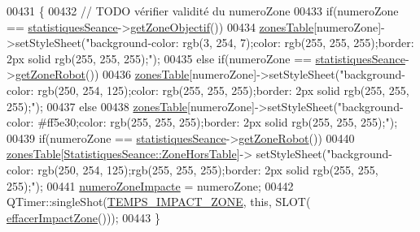 \begin{DoxyCode}
00431 \{
00432     \textcolor{comment}{// TODO vérifier validité du numeroZone}
00433     \textcolor{keywordflow}{if}(numeroZone == \hyperlink{class_ttpa_ihm_abed6897d6f7b4d3a5eb8dcc07651e740}{statistiquesSeance}->\hyperlink{class_statistiques_seance_a61c01cb1d35cda871e8243658213ee5b}{getZoneObjectif}())
00434         \hyperlink{class_ttpa_ihm_af77d75f1aa3eb901b9410e5fc465ece8}{zonesTable}[numeroZone]->setStyleSheet(\textcolor{stringliteral}{"background-color: rgb(3, 254, 7);color: rgb(255,
       255, 255);border: 2px solid rgb(255, 255, 255);"});
00435     \textcolor{keywordflow}{else} \textcolor{keywordflow}{if}(numeroZone == \hyperlink{class_ttpa_ihm_abed6897d6f7b4d3a5eb8dcc07651e740}{statistiquesSeance}->\hyperlink{class_statistiques_seance_ad1bdc22fbd9f37fab06d9fc24e9f1bc4}{getZoneRobot}())        
00436         \hyperlink{class_ttpa_ihm_af77d75f1aa3eb901b9410e5fc465ece8}{zonesTable}[numeroZone]->setStyleSheet(\textcolor{stringliteral}{"background-color: rgb(250, 254, 125);color:
       rgb(255, 255, 255);border: 2px solid rgb(255, 255, 255);"});
00437     \textcolor{keywordflow}{else}        
00438         \hyperlink{class_ttpa_ihm_af77d75f1aa3eb901b9410e5fc465ece8}{zonesTable}[numeroZone]->setStyleSheet(\textcolor{stringliteral}{"background-color: #ff5e30;color: rgb(255, 255,
       255);border: 2px solid rgb(255, 255, 255);"});
00439     \textcolor{keywordflow}{if}(numeroZone == \hyperlink{class_ttpa_ihm_abed6897d6f7b4d3a5eb8dcc07651e740}{statistiquesSeance}->\hyperlink{class_statistiques_seance_ad1bdc22fbd9f37fab06d9fc24e9f1bc4}{getZoneRobot}())        
00440         \hyperlink{class_ttpa_ihm_af77d75f1aa3eb901b9410e5fc465ece8}{zonesTable}[\hyperlink{class_statistiques_seance_aa839f5192cbadd7c3fb3651d62eff8b5aeb6ef225df9153e1f46a968ae71bf2f3}{StatistiquesSeance::ZoneHorsTable}]->
      setStyleSheet(\textcolor{stringliteral}{"background-color: rgb(250, 254, 125);rgb(255, 255, 255);border: 2px solid rgb(255, 255, 255);"});
00441     \hyperlink{class_ttpa_ihm_af8fa0aee928ee727f27ff605c0c1d991}{numeroZoneImpacte} = numeroZone;
00442     QTimer::singleShot(\hyperlink{ttpaihm_8h_a9b6e17fdcabfecc63689f88d52e369ad}{TEMPS\_IMPACT\_ZONE}, \textcolor{keyword}{this}, SLOT(
      \hyperlink{class_ttpa_ihm_abe9973c64673cdaa067617f9246781d2}{effacerImpactZone}()));
00443 \}
\end{DoxyCode}
\mbox{\label{class_ttpa_ihm_aa480a02532144d0f99af027b5b201ae1}} 
